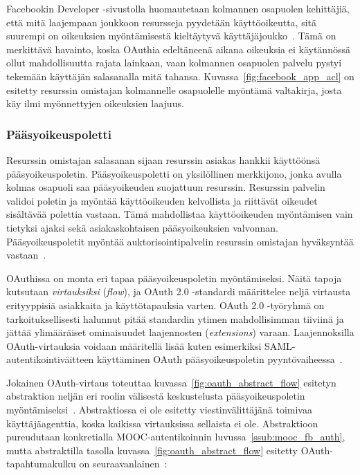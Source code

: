 \documentclass[finnish,gradu]{tktltiki}
\begin{document}
  Facebookin Developer -sivustolla huomautetaan kolmannen osapuolen kehittäjiä, että mitä laajempaan joukkoon resursseja pyydetään käyttöoikeutta, sitä suurempi on oikeuksien myöntämisestä kieltäytyvä käyttäjäjoukko~\cite{facebook_oauth2_doc}. Tämä on merkittävä havainto, koska OAuthia edeltäneenä aikana oikeuksia ei käytännössä ollut mahdollisuutta rajata lainkaan, vaan kolmannen osapuolen palvelu pystyi tekemään käyttäjän salasanalla mitä tahansa. Kuvassa~\ref{fig:facebook_app_acl} on esitetty resurssin omistajan kolmannelle osapuolelle myöntämä valtakirja, josta käy ilmi myönnettyjen oikeuksien laajuus.




  \subsubsection{Pääsyoikeuspoletti} %
  \label{ssub:oauth_tokenit}

  Resurssin omistajan salasanan sijaan resurssin asiakas hankkii käyttöönsä pääsyoikeuspoletin. Pääsyoikeuspoletti on yksilöllinen merkkijono, jonka avulla kolmas osapuoli saa pääsyoikeuden suojattuun resurssin. Resurssin palvelin validoi poletin ja myöntää käyttöoikeuden kelvollista ja riittävät oikeudet sisältävää polettia vastaan. Tämä mahdollistaa käyttöoikeuden myöntämisen vain tietyksi ajaksi sekä asiakaskohtaisen pääsyoikeuksien valvonnan. Pääsyoikeuspoletit myöntää auktorisointipalvelin resurssin omistajan hyväksyntää vastaan~\cite{ietf_oauth2}.

  OAuthissa on monta eri tapaa pääsyoikeuspoletin myöntämiseksi. Näitä tapoja kutsutaan \emph{virtauksiksi} (\emph{flow}), ja OAuth 2.0 -standardi määrittelee neljä virtausta erityyppisiä asiakkaita ja käyttötapauksia varten. OAuth 2.0 -työryhmä on tarkoituksellisesti halunnut pitää standardin ytimen mahdollisimman tiiviinä ja jättää ylimääräiset ominaisuudet laajennosten (\emph{extensions}) varaan. Laajennoksilla OAuth-virtauksia voidaan määritellä lisää kuten esimerkiksi SAML-autentikointiväitteen käyttäminen OAuth pääsyoikeuspoletin pyyntövaiheessa~\cite{ietf_oauth2_saml_bearer}.

  Jokainen OAuth-virtaus toteuttaa kuvassa~\ref{fig:oauth_abstract_flow} esitetyn abstraktion neljän eri roolin välisestä keskustelusta pääsyoikeuspoletin myöntämiseksi~\cite{ietf_oauth2}. Abstraktiossa ei ole esitetty viestinvälittäjänä toimivaa käyttäjäagenttia, koska kaikissa virtauksissa sellaista ei ole. Abstraktioon pureudutaan konkretialla MOOC-autentikoinnin luvussa~\ref{ssub:mooc_fb_auth}, mutta abstraktilla tasolla kuvassa~\ref{fig:oauth_abstract_flow} esitetty OAuth-tapahtumakulku on seuraavanlainen~\cite{ietf_oauth2}:
\end{document}
